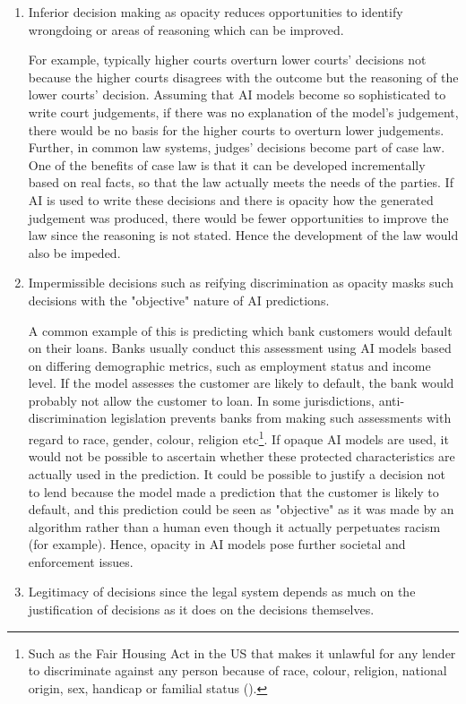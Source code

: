 \begin{enumerate}
  \item Inferior decision making as opacity reduces opportunities to identify wrongdoing or areas of reasoning which can be improved. 
  
  For example, typically higher courts overturn lower courts' decisions not because the higher courts disagrees with the outcome but the reasoning of the lower courts' decision. Assuming that AI models become so sophisticated to write court judgements, if there was no explanation of the model's judgement, there would be no basis for the higher courts to overturn lower judgements. Further, in common law systems, judges' decisions become part of case law. One of the benefits of case law is that it can be developed incrementally based on real facts, so that the law actually meets the needs of the parties. If AI is used to write these decisions and there is opacity how the generated judgement was produced, there would be fewer opportunities to improve the law since the reasoning is not stated. Hence the development of the law would also be impeded.

  \item Impermissible decisions such as reifying discrimination as opacity masks such decisions with the "objective" nature of AI predictions.
  
  A common example of this is predicting which bank customers would default on their loans. Banks usually conduct this assessment using AI models based on differing demographic metrics, such as employment status and income level. If the model assesses the customer are likely to default, the bank would probably not allow the customer to loan. In some jurisdictions, anti-discrimination legislation prevents banks from making such assessments with regard to race, gender, colour, religion etc\footnote{Such as the Fair Housing Act in the US that makes it unlawful for any lender to discriminate against any person because of race, colour, religion, national origin, sex, handicap or familial status (\cite{fairhousingact}).}. If opaque AI models are used, it would not be possible to ascertain whether these protected characteristics are actually used in the prediction. It could be possible to justify a decision not to lend because the model made a prediction that the customer is likely to default, and this prediction could be seen as "objective" as it was made by an algorithm rather than a human even though it actually perpetuates racism (for example). Hence, opacity in AI models pose further societal and enforcement issues.

  \item Legitimacy of decisions since the legal system depends as much on the justification of decisions as it does on the decisions themselves.
\end{enumerate}

